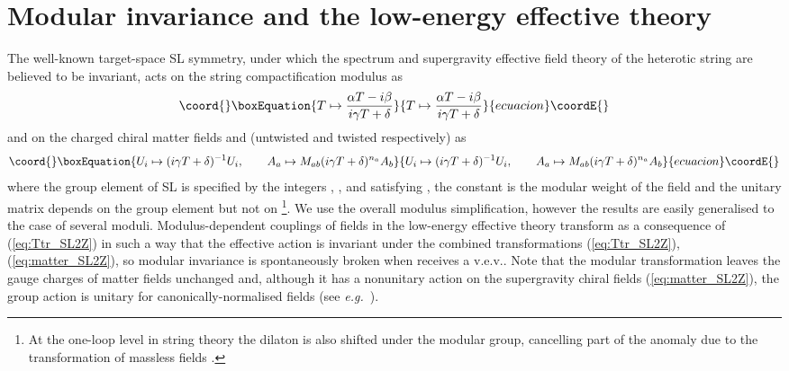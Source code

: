 \documentclass[a4paper,12pt]{article}
\begin{document}
\section{Modular invariance and the low-energy effective theory} 

The well-known target-space SL\coordHE{} symmetry, under which the spectrum and supergravity effective field theory of the heterotic string are believed to be invariant, acts on the string compactification modulus \coordHE{} as
\begin{equation}\coord{}\boxEquation{
T \mapsto \frac{\alpha T-i\beta}{i\gamma T+\delta} \label{eq:Ttr_SL2Z}
}{
T \mapsto \frac{\alpha T-i\beta}{i\gamma T+\delta} }{ecuacion}\coordE{}\end{equation}
and on the charged chiral matter fields \coordHE{} and \coordHE{} (untwisted and twisted respectively) as
\begin{equation}\coord{}\boxEquation{ 
U_i \mapsto (i\gamma T+\delta)^{-1}U_i, \qquad A_a \mapsto M_{ab} (i\gamma T+\delta)^{n_a} A_b \label{eq:matter_SL2Z}
}{ 
U_i \mapsto (i\gamma T+\delta)^{-1}U_i, \qquad A_a \mapsto M_{ab} (i\gamma T+\delta)^{n_a} A_b }{ecuacion}\coordE{}\end{equation}
where the group element \coordHE{} of SL\coordHE{} is specified by the integers \myHighlight{$\alpha$}\coordHE{}, \myHighlight{$\beta$}\coordHE{}, \myHighlight{$\gamma$}\coordHE{} and \myHighlight{$\delta$}\coordHE{} satisfying \coordHE{}, the constant \coordHE{} is the modular weight of the field \coordHE{} and the unitary matrix \coordHE{} depends on the group element \coordHE{} but not on \coordHE{} \cite{FerraraLT,LauerMN91}\footnote{At the one-loop level in string theory the dilaton \coordHE{} is also shifted under the modular group, cancelling part of the anomaly due to the transformation of massless fields \cite{DerendingerFKZ,Ibanez:1992hc}.}. We use the overall modulus simplification, however the results are easily generalised to the case of several moduli. Modulus-dependent couplings of fields in the low-energy effective theory transform as a consequence of (\ref{eq:Ttr_SL2Z}) in such a way that the effective action is invariant under the combined transformations (\ref{eq:Ttr_SL2Z}), (\ref{eq:matter_SL2Z}), so modular invariance is spontaneously broken when \coordHE{} receives a v.e.v.. Note that the modular transformation leaves the gauge charges of matter fields unchanged and, although it has a nonunitary action on the supergravity chiral fields (\ref{eq:matter_SL2Z}), the group action is unitary for canonically-normalised fields (see {\em e.g.\/}\ \cite{deCarlos:1993pd}).
\end{document}
